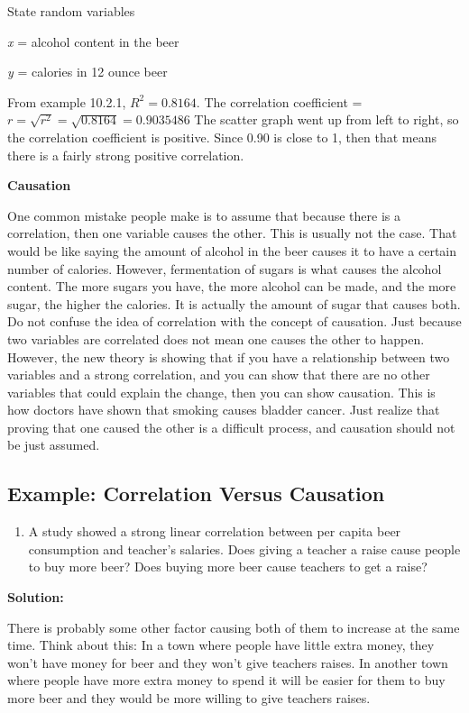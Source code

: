 \documentclass[
]{book}
\providecommand{\tightlist}{%
  \setlength{\itemsep}{0pt}\setlength{\parskip}{0pt}}
\begin{document}
State random variables

\emph{x} = alcohol content in the beer

\emph{y} = calories in 12 ounce beer

From example 10.2.1, \(R^2=0.8164\). The correlation coefficient = \(r=\sqrt{r^2}=\sqrt{0.8164}=0.9035486\) The scatter graph went up from left to right, so the correlation coefficient is positive. Since 0.90 is close to 1, then that means there is a fairly strong positive correlation.

\textbf{Causation}

One common mistake people make is to assume that because there is a correlation, then one variable causes the other. This is usually not the case. That would be like saying the amount of alcohol in the beer causes it to have a certain number of calories. However, fermentation of sugars is what causes the alcohol content. The more sugars you have, the more alcohol can be made, and the more sugar, the higher the calories. It is actually the amount of sugar that causes both. Do not confuse the idea of correlation with the concept of causation. Just because two variables are correlated does not mean one causes the other to happen. However, the new theory is showing that if you have a relationship between two variables and a strong correlation, and you can show that there are no other variables that could explain the change, then you can show causation. This is how doctors have shown that smoking causes bladder cancer. Just realize that proving that one caused the other is a difficult process, and causation should not be just assumed.

\hypertarget{example-correlation-versus-causation}{%
\subsection{Example: Correlation Versus Causation}\label{example-correlation-versus-causation}}

\begin{enumerate}
\def\labelenumi{\alph{enumi}.}
\tightlist
\item
  A study showed a strong linear correlation between per capita beer consumption and teacher's salaries. Does giving a teacher a raise cause people to buy more beer? Does buying more beer cause teachers to get a raise?
\end{enumerate}

\textbf{Solution:}

There is probably some other factor causing both of them to increase at the same time. Think about this: In a town where people have little extra money, they won't have money for beer and they won't give teachers raises. In another town where people have more extra money to spend it will be easier for them to buy more beer and they would be more willing to give teachers raises.
\end{document}

